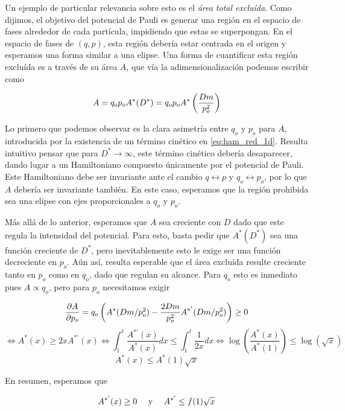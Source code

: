 Un ejemplo de particular relevancia sobre esto es el \textit{área total excluída}.
Como dijimos, el objetivo del potencial de Pauli es generar una región en el espacio de fases alrededor de cada partícula, impidiendo que estas se superpongan.
En el espacio de fases de $(q,p)$, esta región debería estar centrada en el origen y esperamos una forma similar a una elipse.
Una forma de cuantificar esta región excluída es a través de su área $A$, que vía la adimensionalización podemos escribir como

\begin{equation}{\label{eq:area_red}}
A = q_op_oA^*(D^*) = q_op_oA^*\left( \frac{Dm}{p_o^2} \right)
\end{equation}

Lo primero que podemos observar es la clara asimetría entre $q_o$ y $p_o$ para $A$, introducida por la existencia de un término cinético en \ref{eq:ham_red_1d}.
Resulta intuitivo pensar que para $D^*\to\infty$, este término cinético debería desaparecer, dando lugar a un Hamiltoniano compuesto únicamente por el potencial de Pauli.
Este Hamiltoniano debe ser invariante ante el cambio $q\leftrightarrow p$ y $q_o\leftrightarrow p_o$, por lo que $A$ debería ser invariante también.
En este caso, esperamos que la región prohibida sea una elipse con ejes proporcionales a $q_o$ y $p_o$.

Más allá de lo anterior, esperamos que $A$ sea creciente con $D$ dado que este regula la intensidad del potencial.
Para esto, basta pedir que $A^*(D^*)$ sea una función creciente de $D^*$, pero inevitablemente esto le exige ser una función decreciente en $p_o$.
Aún así, resulta esperable que el área excluída resulte creciente tanto en $p_o$ como en $q_o$, dado que regulan su alcance.
Para $q_o$ esto es inmediato pues $A\propto q_o$, pero para $p_o$ necesitamos exigir

\[ \frac{\partial A}{\partial p_o} = q_o\left( A^*(Dm/p_o^2) - \frac{2Dm}{p_o^2}A^{*'}(Dm/p_o^2) \right) \geq 0\]
\[ \Longleftrightarrow A^*(x) \geq 2x A^{*'}(x) \Longleftrightarrow  \int_1^t \frac{A^{*'}(x)}{A^*(x)}dx \leq \int_1^t\frac{1}{2x}dx \Longleftrightarrow \log{\left(\frac{A^*(x)}{A^*(1)}\right)} \leq \log{(\sqrt{x})} \]
\[ A^*(x) \leq A^*(1) \sqrt{x}\]

En resumen, esperamos que

\begin{equation}{\label{eq:props_area_red}}
A^{*'}(x)\geq 0 \quad \text{ y } \quad A^{*'}\leq f(1)\sqrt{x}
\end{equation}



